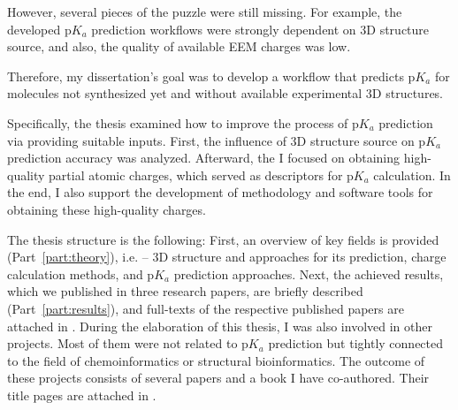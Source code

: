 However, several pieces of the puzzle were still missing. For example, the
developed p$K_a$ prediction workflows \cite{Svobodova2013} were strongly
dependent on 3D structure source, and also, the quality of available EEM charges
was low.

Therefore, my dissertation's goal was to develop a workflow that predicts p$K_a$
for mo\-le\-cu\-les not synthesized yet and without available experimental 3D
structures.

Specifically, the thesis examined how to improve the process of p$K_a$
prediction via providing suitable inputs. First, the influence of 3D structure
source on p$K_a$ prediction accuracy was analyzed. Afterward, the I focused
on obtaining high-quality partial atomic charges, which served as descriptors
for p$K_a$ calculation. In the end, I also support the development
of methodology and software tools for obtaining these high-quality charges.

The thesis structure is the following: First, an overview of key fields is
provided (Part~\ref{part:theory}), i.e. -- 3D structure and approaches for its prediction,
charge calculation methods, and p$K_a$ prediction approaches. Next, the
achieved results, which we published in three research papers, are brieﬂy
described (Part~\ref{part:results}), and full-texts of the respective published papers are
attached in . During the elaboration of this thesis, I was also involved
in other projects. Most of them were not related to p$K_a$ prediction but
tightly connected to the ﬁeld of chemoinformatics or structural bioinformatics.
The outcome of these projects consists of several papers and a book I have
co-authored. Their title pages are attached in .


